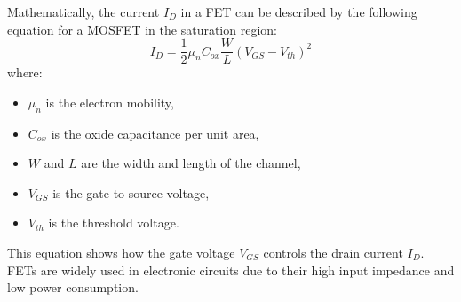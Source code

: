 Mathematically, the current \( I_D \) in a FET can be described by the following equation for a MOSFET in the saturation region:
\[
I_D = \frac{1}{2} \mu_n C_{ox} \frac{W}{L} (V_{GS} - V_{th})^2
\]
where:
\begin{itemize}
    \item \( \mu_n \) is the electron mobility,
    \item \( C_{ox} \) is the oxide capacitance per unit area,
    \item \( W \) and \( L \) are the width and length of the channel,
    \item \( V_{GS} \) is the gate-to-source voltage,
    \item \( V_{th} \) is the threshold voltage.
\end{itemize}

This equation shows how the gate voltage \( V_{GS} \) controls the drain current \( I_D \). FETs are widely used in electronic circuits due to their high input impedance and low power consumption.

